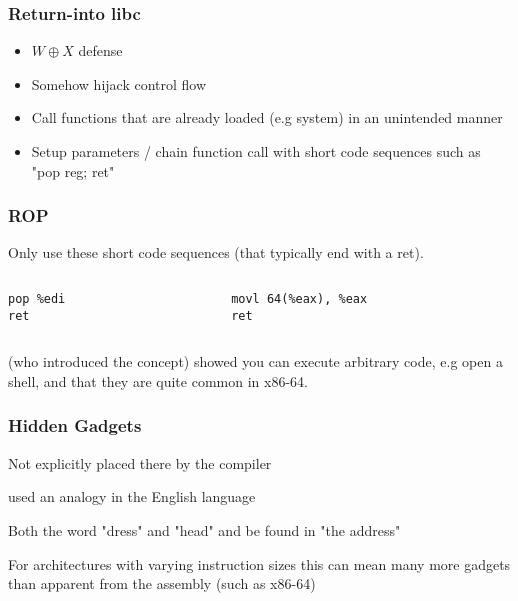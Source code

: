 \begin{frame}
	\frametitle{Return-into libc}

	\begin{itemize}
		\item $W \oplus X$ defense
		\item Somehow hijack control flow
		\item Call functions that are already loaded (e.g system) in an unintended manner
		\item Setup parameters / chain function call with short code sequences such as "pop reg; ret"
	\end{itemize}
\end{frame}

\begin{frame}[fragile]
	\frametitle{ROP}

	Only use these short code sequences (that typically end with a ret).

	\vspace{0.5cm}

	\begin{columns}
		\begin{column}{0.5\textwidth}
			\begin{lstlisting}[tabsize=2,frame=single,language={[x86masm]Assembler}]
pop %edi
ret
			\end{lstlisting}
		\end{column}

		\begin{column}{0.5\textwidth}
			\begin{lstlisting}[tabsize=2,frame=single,language={[x86masm]Assembler}]
movl 64(%eax), %eax
ret
			\end{lstlisting}
		\end{column}
	\end{columns}

	\vspace{0.5cm}

	\textcite{rop} (who introduced the concept) showed you can execute arbitrary code, e.g
	open a shell, and that they are quite common in x86-64.

\end{frame}

\begin{frame}
	\frametitle{Hidden Gadgets}
	Not explicitly placed there by the compiler

	\vspace{0.5cm}

	\textcite{rop} used an analogy in the English language

	\vspace{0.5cm}

	Both the word "dress" and "head" and be found in "the address"

	\vspace{0.5cm}

	For architectures with varying instruction sizes this can mean many more gadgets
	than apparent from the assembly (such as x86-64)

\end{frame}


